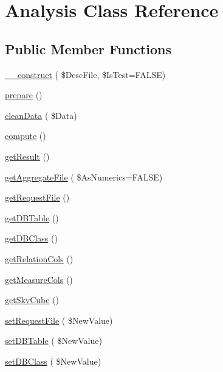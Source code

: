 \hypertarget{class_analysis}{}\section{Analysis Class Reference}
\label{class_analysis}
\subsection*{Public Member Functions}
\begin{DoxyCompactItemize}
\item 
\hyperlink{class_analysis_a7271f22de624d83a4f74593ec9c810c2}{\+\_\+\+\_\+construct} ( \$Desc\+File, \$Is\+Test=F\+A\+L\+SE)
\item 
\hyperlink{class_analysis_ab640c304003ffe30395f331260b4c83c}{prepare} ()
\item 
\hyperlink{class_analysis_a34bdf918d6d336179058ad82cee4d7dd}{clean\+Data} ( \$Data)
\item 
\hyperlink{class_analysis_a034c1e5ed7251cf8ebbe9a2f03ca0785}{compute} ()
\item 
\hyperlink{class_analysis_ad7ad2fad370d3fa72512d3846f33618d}{get\+Result} ()
\item 
\hyperlink{class_analysis_a3a36df8e0acaa0d84d66483f395a913c}{get\+Aggregate\+File} ( \$As\+Numerics=F\+A\+L\+SE)
\item 
\hyperlink{class_analysis_a162e4c51057c935b438264abe15feb24}{get\+Request\+File} ()
\item 
\hyperlink{class_analysis_aac54f4f73bcd61b1472f22e0dbd0ea46}{get\+D\+B\+Table} ()
\item 
\hyperlink{class_analysis_ac2da7aa0c6cb2b44acf3f4551ffc1b69}{get\+D\+B\+Class} ()
\item 
\hyperlink{class_analysis_a90b84a8fb6cf7b7dbd06ce835300e69c}{get\+Relation\+Cols} ()
\item 
\hyperlink{class_analysis_aa2139069d2b1f559a9df6f690c8cf076}{get\+Measure\+Cols} ()
\item 
\hyperlink{class_analysis_a19f2ae7fb1a840da628415f3f86a748a}{get\+Sky\+Cube} ()
\item 
\hyperlink{class_analysis_ab921506f207e5b174d3cdef504721169}{set\+Request\+File} ( \$New\+Value)
\item 
\hyperlink{class_analysis_a3d36fa472e9426224299a2b2fd03bc48}{set\+D\+B\+Table} ( \$New\+Value)
\item 
\hyperlink{class_analysis_aabddf37a4240bafefd66b2bbff1b3058}{set\+D\+B\+Class} ( \$New\+Value)
\item 

\end{DoxyCompactItemize}
